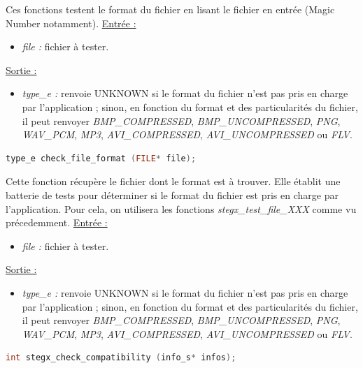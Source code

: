 \documentclass[11pt]{article}
\begin{document}
Ces fonctions testent le format du fichier en lisant le fichier en entrée 
(Magic Number notamment). 
\newline
\underline{Entrée :} 
\begin{itemize}
\item \textit{file :} fichier à tester. 
\end{itemize}
\underline{Sortie :} 
\begin{itemize}
\item \textit{type\_e :} renvoie UNKNOWN si le format du fichier n'est pas pris en 
charge par l'application ; sinon, en fonction du format et des particularités 
du fichier, il peut renvoyer \textit{BMP\_COMPRESSED}, \textit{BMP\_UNCOMPRESSED}, 
\textit{PNG}, \textit{WAV\_PCM}, \textit{MP3}, \textit{AVI\_COMPRESSED}, 
\textit{AVI\_UNCOMPRESSED} ou \textit{FLV}. 
\newline 
\end{itemize}

\begin{lstlisting}[language=c]
type_e check_file_format (FILE* file);
\end{lstlisting}

Cette fonction récupère le fichier dont le format est à trouver. Elle établit une 
batterie de tests pour déterminer si le format du fichier est pris en charge 
par l'application. 
Pour cela, on utilisera les fonctions \textit{stegx\_test\_file\_XXX} 
comme vu précedemment. 
\newline
\underline{Entrée :} 
\begin{itemize}
\item \textit{file :} fichier à tester. 
\end{itemize}
\underline{Sortie :} 
\begin{itemize}
\item \textit{type\_e :} renvoie UNKNOWN si le format du fichier n'est pas pris en 
charge par l'application ; sinon, en fonction du format et des particularités 
du fichier, il peut renvoyer \textit{BMP\_COMPRESSED}, \textit{BMP\_UNCOMPRESSED}, 
\textit{PNG}, \textit{WAV\_PCM}, \textit{MP3}, \textit{AVI\_COMPRESSED}, 
\textit{AVI\_UNCOMPRESSED} ou \textit{FLV}. 
\newline 
\end{itemize}

\begin{lstlisting}[language=c]
int stegx_check_compatibility (info_s* infos);
\end{lstlisting}
\end{document}
